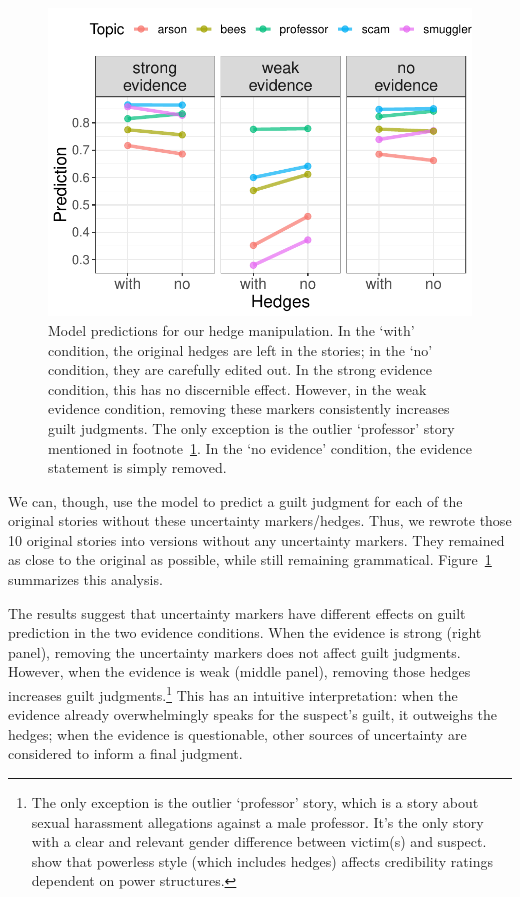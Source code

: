 \documentclass[11pt,a4paper]{article}
\begin{document}
\begin{figure}
  \includegraphics[width=1\linewidth]{graphs/hedges.pdf}
  \caption{Model predictions for our hedge manipulation. In the `with' condition,
    the original hedges are left in the stories; in the `no' condition, they are
    carefully edited out. In the strong evidence condition, this has no discernible
    effect. However, in the weak evidence condition, removing these markers
    consistently increases guilt judgments. 
    The only exception is the outlier `professor' story mentioned in footnote~\ref{fn:prof}. 
    In the `no evidence' condition, the evidence statement is simply removed.}
  \label{fig:hedges}
\end{figure}


We can, though, use the model to predict a guilt judgment for each of the original stories without these uncertainty markers/hedges. Thus, we rewrote those 10 original stories into versions without any uncertainty markers. They remained as close to the original as possible, while still remaining grammatical. Figure~\ref{fig:hedges} summarizes this analysis.

The results suggest that uncertainty markers have different effects on guilt prediction in the two evidence conditions. When the evidence is strong (right panel), removing the uncertainty markers does not affect guilt judgments. However, when the evidence is weak (middle panel), removing those hedges increases guilt judgments.\footnote{The only exception is the outlier `professor' story, which is a story about sexual harassment allegations against a male professor. It's the only story with a clear and relevant gender difference between victim(s) and suspect. \citet{Erickson-etal:1978} show that powerless style (which includes hedges) affects credibility ratings dependent on power structures.\label{fn:prof}} This has an intuitive interpretation: when the evidence already overwhelmingly speaks for the suspect's guilt, it outweighs the hedges; when the evidence is questionable, other sources of uncertainty are considered to inform a final judgment.
\end{document}
